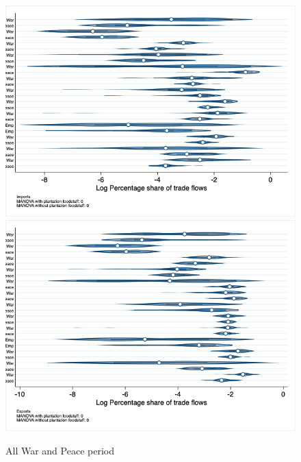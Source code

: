 \documentclass[12pt,a4paper,notitlepage,english]{article}
\begin{document}
\begin{figure}
\caption{All War and Peace period}
\label{peace_war_nat_distr}
\includegraphics[scale=.4]{peace_war_nat_distr_Ipays}
\includegraphics[scale=.4]{peace_war_nat_distr_Xpays}
\end{figure}
\end{document}
